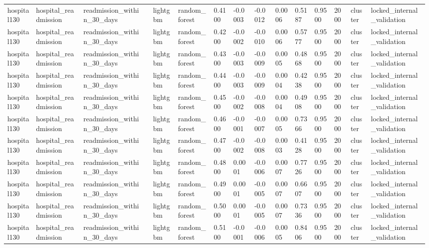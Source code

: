 \begin{tabular}{lllllllllllllll}
hospital130 & hospital\_readmission & readmission\_within\_30\_days &  & lightgbm & random\_forest & 0.4100 & -0.0003 & -0.0012 & 0.0006 & 0.5187 & 0.9500 & 2000 & cluster & locked\_internal\_validation \\
hospital130 & hospital\_readmission & readmission\_within\_30\_days &  & lightgbm & random\_forest & 0.4200 & -0.0002 & -0.0010 & 0.0006 & 0.5777 & 0.9500 & 2000 & cluster & locked\_internal\_validation \\
hospital130 & hospital\_readmission & readmission\_within\_30\_days &  & lightgbm & random\_forest & 0.4300 & -0.0003 & -0.0009 & 0.0005 & 0.4868 & 0.9500 & 2000 & cluster & locked\_internal\_validation \\
hospital130 & hospital\_readmission & readmission\_within\_30\_days &  & lightgbm & random\_forest & 0.4400 & -0.0003 & -0.0009 & 0.0004 & 0.4238 & 0.9500 & 2000 & cluster & locked\_internal\_validation \\
hospital130 & hospital\_readmission & readmission\_within\_30\_days &  & lightgbm & random\_forest & 0.4500 & -0.0002 & -0.0008 & 0.0004 & 0.4908 & 0.9500 & 2000 & cluster & locked\_internal\_validation \\
hospital130 & hospital\_readmission & readmission\_within\_30\_days &  & lightgbm & random\_forest & 0.4600 & -0.0001 & -0.0007 & 0.0005 & 0.7366 & 0.9500 & 2000 & cluster & locked\_internal\_validation \\
hospital130 & hospital\_readmission & readmission\_within\_30\_days &  & lightgbm & random\_forest & 0.4700 & -0.0002 & -0.0008 & 0.0003 & 0.4128 & 0.9500 & 2000 & cluster & locked\_internal\_validation \\
hospital130 & hospital\_readmission & readmission\_within\_30\_days &  & lightgbm & random\_forest & 0.4800 & 0.0001 & -0.0006 & 0.0007 & 0.7726 & 0.9500 & 2000 & cluster & locked\_internal\_validation \\
hospital130 & hospital\_readmission & readmission\_within\_30\_days &  & lightgbm & random\_forest & 0.4900 & 0.0001 & -0.0005 & 0.0007 & 0.6607 & 0.9500 & 2000 & cluster & locked\_internal\_validation \\
hospital130 & hospital\_readmission & readmission\_within\_30\_days &  & lightgbm & random\_forest & 0.5000 & 0.0001 & -0.0005 & 0.0007 & 0.7336 & 0.9500 & 2000 & cluster & locked\_internal\_validation \\
hospital130 & hospital\_readmission & readmission\_within\_30\_days &  & lightgbm & random\_forest & 0.5100 & -0.0001 & -0.0006 & 0.0005 & 0.8406 & 0.9500 & 2000 & cluster & locked\_internal\_validation \\

\end{tabular}
